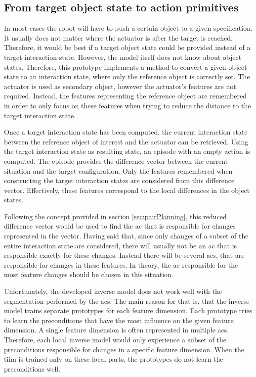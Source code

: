 \subsection{From target object state to action primitives\label{sec:pairPlanningReal}}

In most cases the robot will have to push a certain object to a given specification. It usually does not matter where the actuator is after the target is reached. Therefore, it would be best if a target object state could be provided instead of a target interaction state. However, the model itself does not know about object states. Therefore, this prototype implements a method to convert a given object state to an interaction state, where only the reference object is correctly set. The actuator is used as secondary object, however the actuator's features are not required. Instead, the features representing the reference object are remembered in order to only focus on these features when trying to reduce the distance to the target interaction state. 

Once a target interaction state has been computed, the current interaction state between the reference object of interest and the actuator can be retrieved. Using the target interaction state as resulting state, an episode with an empty action is computed. The episode provides the difference vector between the current situation and the target configuration. Only the features remembered when constructing the target interaction states are considered from this difference vector. Effectively, these features correspond to the local differences in the object states. 

Following the concept provided in section \ref{sec:pairPlanning}, this reduced difference vector would be used to find the \gls{ac} that is responsible for changes represented in the vector.
Having said that, since only changes of a subset of the entire interaction state are considered, there will usually not be an \gls{ac} that is responsible exactly for these changes. 
Instead there will be several \glspl{ac}, that are responsible for changes in these features. In theory, the \gls{ac} responsible for the most feature changes should be chosen in this situation. 

Unfortunately, the developed inverse model does not work well with the segmentation performed by the \glspl{ac}. The main reason for that is, that the inverse model trains separate prototypes for each feature dimension.
Each prototype tries to learn the preconditions that have the most influence on the given feature dimension. A single feature dimension is often represented in multiple \glspl{ac}. Therefore, each local inverse model would only experience a subset of the preconditions responsible for changes in a specific feature dimension. When the \gls{tiim} is trained only on these local parts, the prototypes do not learn the preconditions well.

